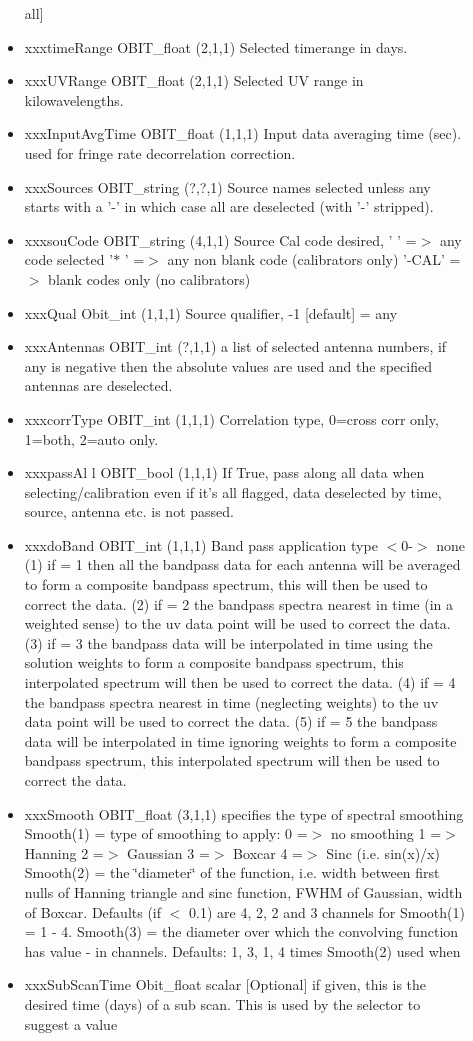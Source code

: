 \begin{Desc}
\begin{description}
\begin{itemize}
all] \item xxxtime\-Range OBIT\_\-float (2,1,1) Selected timerange in days. \item xxx\-UVRange OBIT\_\-float (2,1,1) Selected UV range in kilowavelengths. \item xxx\-Input\-Avg\-Time OBIT\_\-float (1,1,1) Input data averaging time (sec). used for fringe rate decorrelation correction. \item xxx\-Sources OBIT\_\-string (?,?,1) Source names selected unless any starts with a '-' in which case all are deselected (with '-' stripped). \item xxxsou\-Code OBIT\_\-string (4,1,1) Source Cal code desired, ' ' =$>$ any code selected '$\ast$ ' =$>$ any non blank code (calibrators only) '-CAL' =$>$ blank codes only (no calibrators) \item xxx\-Qual Obit\_\-int (1,1,1) Source qualifier, -1 [default] = any \item xxx\-Antennas OBIT\_\-int (?,1,1) a list of selected antenna numbers, if any is negative then the absolute values are used and the specified antennas are deselected. \item xxxcorr\-Type OBIT\_\-int (1,1,1) Correlation type, 0=cross corr only, 1=both, 2=auto only. \item xxxpass\-Al l OBIT\_\-bool (1,1,1) If True, pass along all data when selecting/calibration even if it's all flagged, data deselected by time, source, antenna etc. is not passed. \item xxxdo\-Band OBIT\_\-int (1,1,1) Band pass application type $<$0-$>$ none (1) if = 1 then all the bandpass data for each antenna will be averaged to form a composite bandpass spectrum, this will then be used to correct the data. (2) if = 2 the bandpass spectra nearest in time (in a weighted sense) to the uv data point will be used to correct the data. (3) if = 3 the bandpass data will be interpolated in time using the solution weights to form a composite bandpass spectrum, this interpolated spectrum will then be used to correct the data. (4) if = 4 the bandpass spectra nearest in time (neglecting weights) to the uv data point will be used to correct the data. (5) if = 5 the bandpass data will be interpolated in time ignoring weights to form a composite bandpass spectrum, this interpolated spectrum will then be used to correct the data. \item xxx\-Smooth OBIT\_\-float (3,1,1) specifies the type of spectral smoothing Smooth(1) = type of smoothing to apply: 0 =$>$ no smoothing 1 =$>$ Hanning 2 =$>$ Gaussian 3 =$>$ Boxcar 4 =$>$ Sinc (i.e. sin(x)/x) Smooth(2) = the \char`\"{}diameter\char`\"{} of the function, i.e. width between first nulls of Hanning triangle and sinc function, FWHM of Gaussian, width of Boxcar. Defaults (if $<$ 0.1) are 4, 2, 2 and 3 channels for Smooth(1) = 1 - 4. Smooth(3) = the diameter over which the convolving function has value - in channels. Defaults: 1, 3, 1, 4 times Smooth(2) used when \item xxx\-Sub\-Scan\-Time Obit\_\-float scalar [Optional] if given, this is the desired time (days) of a sub scan. This is used by the selector to suggest a value 
\end{itemize}
\end{description}
\end{Desc}
